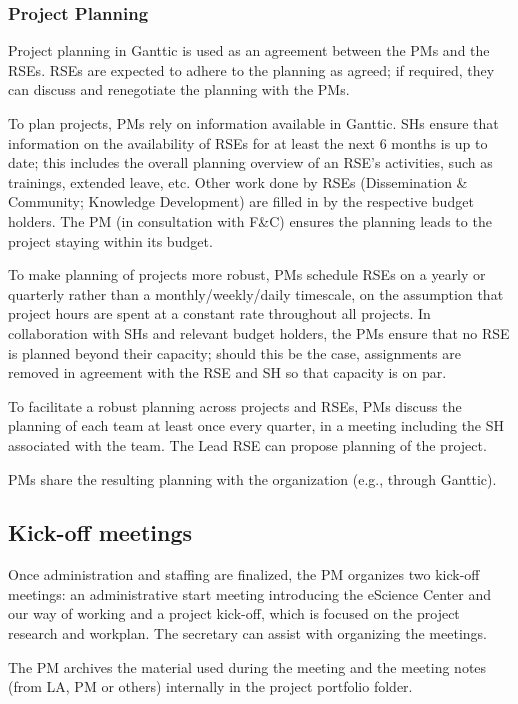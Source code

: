 \subsubsection{Project Planning}

Project planning in Ganttic is used as an agreement between the PMs and the RSEs. RSEs are expected to adhere to the
planning as agreed; if required, they can discuss and renegotiate the planning with the PMs.

To plan projects, PMs rely on information available in Ganttic. SHs ensure that information on the availability of RSEs
for at least the next 6 months is up to date; this includes the overall planning overview of an
RSE's activities, such as trainings, extended leave, etc. Other work done by RSEs (Dissemination
\& Community; Knowledge Development) are filled in by the respective budget holders. The PM (in consultation with F\&C)
ensures the planning leads to the project staying within its budget.

To make planning of projects more robust, PMs schedule RSEs on a yearly or quarterly rather than a monthly/weekly/daily
timescale, on the assumption that project hours are spent at a constant rate throughout all projects. In collaboration
with SHs and relevant budget holders, the PMs ensure that no RSE is planned beyond their capacity; should this be the
case, assignments are removed in agreement with the RSE and SH so that capacity is on par.

To facilitate a robust planning across projects and RSEs, PMs discuss the planning of each team at least once every
quarter, in a meeting including the SH associated with the team. The Lead RSE can propose planning of the project.

PMs share the resulting planning with the organization (e.g., through Ganttic).


\subsection{Kick-off meetings}
Once administration and staffing are finalized, the PM organizes two kick-off meetings: an administrative start meeting
introducing the eScience Center and our way of working and a project kick-off, which is focused on the project research
and workplan. The secretary can assist with organizing the meetings.

The PM archives the material used during the meeting and the meeting notes (from LA, PM or others) internally in the
project portfolio folder.

